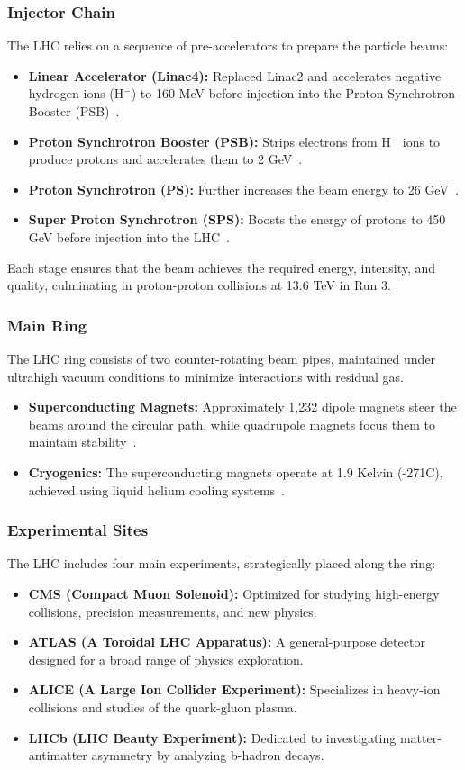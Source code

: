 \subsubsection{Injector Chain}
The LHC relies on a sequence of pre-accelerators to prepare the particle beams:
\begin{itemize}
\item \textbf{Linear Accelerator (Linac4):} Replaced Linac2 and accelerates negative hydrogen ions (H$^-$) to 160 MeV before injection into the Proton Synchrotron Booster (PSB)~\cite{linac4}.
\item \textbf{Proton Synchrotron Booster (PSB):} Strips electrons from H$^-$ ions to produce protons and accelerates them to 2 GeV~\cite{psb}.
\item \textbf{Proton Synchrotron (PS):} Further increases the beam energy to 26 GeV~\cite{ps}.
\item \textbf{Super Proton Synchrotron (SPS):} Boosts the energy of protons to 450 GeV before injection into the LHC~\cite{sps}.
\end{itemize}
Each stage ensures that the beam achieves the required energy, intensity, and quality, culminating in proton-proton collisions at 13.6 TeV in Run 3.

\subsubsection{Main Ring}
The LHC ring consists of two counter-rotating beam pipes, maintained under ultrahigh vacuum conditions to minimize interactions with residual gas.
\begin{itemize}
\item \textbf{Superconducting Magnets:} Approximately 1,232 dipole magnets steer the beams around the circular path, while quadrupole magnets focus them to maintain stability~\cite{superconducting}.
\item \textbf{Cryogenics:} The superconducting magnets operate at 1.9 Kelvin (-271\degree C), achieved using liquid helium cooling systems~\cite{lhc_2024}.
\end{itemize}

\subsubsection{Experimental Sites}
The LHC includes four main experiments, strategically placed along the ring:
\begin{itemize}
\item \textbf{CMS (Compact Muon Solenoid):} Optimized for studying high-energy collisions, precision measurements, and new physics.
\item \textbf{ATLAS (A Toroidal LHC Apparatus):} A general-purpose detector designed for a broad range of physics exploration.
\item \textbf{ALICE (A Large Ion Collider Experiment):} Specializes in heavy-ion collisions and studies of the quark-gluon plasma.
\item \textbf{LHCb (LHC Beauty Experiment):} Dedicated to investigating matter-antimatter asymmetry by analyzing b-hadron decays.
\end{itemize}

